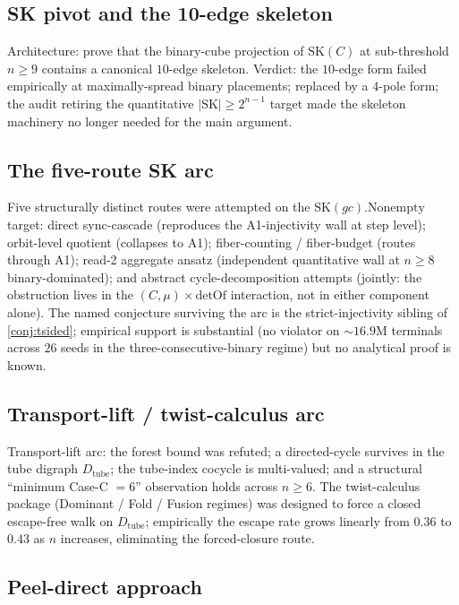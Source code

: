 \documentclass[11pt,a4paper]{article}
\theoremstyle{plain}
\theoremstyle{definition}
\newcommand{\SK}{\mathrm{SK}}
\newcommand{\detOf}{\mathrm{detOf}}
\begin{document}
\subsection{SK pivot and the 10-edge skeleton}\label{app:lndsc-skpivot}

Architecture: prove that the binary-cube projection of $\SK(C)$ at
sub-threshold $n \ge 9$ contains a canonical $10$-edge skeleton.
Verdict: the $10$-edge form failed empirically at maximally-spread
binary placements; replaced by a $4$-pole form; the audit retiring the
quantitative $|\SK| \ge 2^{n-1}$ target made the skeleton machinery
no longer needed for the main argument.

\subsection{The five-route SK arc}\label{app:lndsc-fiveroute}

Five structurally distinct routes were attempted on the
$\SK(gc).\mathrm{Nonempty}$ target: direct sync-cascade (reproduces
the A1-injectivity wall at step level); orbit-level quotient
(collapses to A1); fiber-counting / fiber-budget (routes through A1);
read-2 aggregate ansatz (independent quantitative wall at $n \ge 8$
binary-dominated); and abstract cycle-decomposition attempts
(jointly: the obstruction lives in the $(C, \mu) \times \detOf$
interaction, not in either component alone).  The named conjecture
surviving the arc is the strict-injectivity sibling of
\cref{conj:tsided}; empirical support is substantial
(no violator on $\sim 16.9$M terminals across $26$ seeds in the
three-consecutive-binary regime) but no analytical proof is known.

\subsection{Transport-lift / twist-calculus arc}\label{app:lndsc-twist}

Transport-lift arc: the forest bound was refuted; a directed-cycle
survives in the tube digraph $D_{\mathrm{tube}}$; the tube-index
cocycle is multi-valued; and a structural ``minimum Case-C $= 6$''
observation holds across $n \ge 6$.  The twist-calculus package
(Dominant / Fold / Fusion regimes) was designed to force a closed
escape-free walk on $D_{\mathrm{tube}}$; empirically the escape rate
grows linearly from $0.36$ to $0.43$ as $n$ increases, eliminating
the forced-closure route.

\subsection{Peel-direct approach}\label{app:lndsc-peel}
\end{document}
